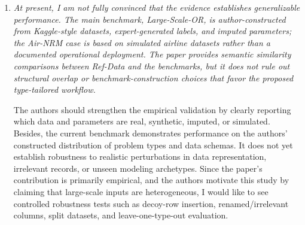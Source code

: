 \documentclass[11pt]{article}
\newcommand{\edit}[1]{{\color{hopkins-blue}\itshape #1}}
\newcommand{\planned}{\noindent\underline{\textbf{Planned response}}:\ }
\begin{document}
\begin{enumerate}[label=(R1.Major.\arabic*),leftmargin=*]

\item \edit{At present, I am not fully convinced that the evidence establishes generalizable performance. The main benchmark, Large-Scale-OR, is author-constructed from Kaggle-style datasets, expert-generated labels, and imputed parameters; the Air-NRM case is based on simulated airline datasets rather than a documented operational deployment. The paper provides semantic similarity comparisons between Ref-Data and the benchmarks, but it does not rule out structural overlap or benchmark-construction choices that favor the proposed type-tailored workflow.

The authors should strengthen the empirical validation by clearly reporting which data and parameters are real, synthetic, imputed, or simulated. Besides, the current benchmark demonstrates performance on the authors' constructed distribution of problem types and data schemas. It does not yet establish robustness to realistic perturbations in data representation, irrelevant records, or unseen modeling archetypes. Since the paper's contribution is primarily empirical, and the authors motivate this study by claiming that large-scale inputs are heterogeneous, I would like to see controlled robustness tests such as decoy-row insertion, renamed/irrelevant columns, split datasets, and leave-one-type-out evaluation.}\label{R1-major-1}







\end{enumerate}
\end{document}
